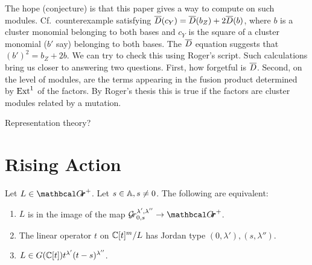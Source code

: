 \documentclass[draft]{article}
\begin{document}
The hope (conjecture) is that this paper gives a way to compute on such modules. Cf.\ counterexample satisfying $\barD(c_Y) = \barD(b_Z) + 2\barD(b)$, where $b$ is a cluster monomial belonging to both bases and $c_Y$ is the square of a cluster monomial ($b'$ say) belonging to both bases. The $\barD$ equation suggests that $(b')^2 = b_Z + 2b$. We can try to check this using Roger's script. Such calculations bring us closer to answering two questions. First, how forgetful is $\barD$. Second, on the level of modules, are the terms appearing in the fusion product determined by $\Ext^1$ of the factors. By Roger's thesis this is true if the factors are cluster modules related by a mutation. 


Representation theory? 

\section{Rising Action} %

\begin{lemma} \label{le:Grl1l2}
    Let $ L \in \Grth^+ $.  Let $ s \in \AA, s \ne 0 $.  The following are equivalent:
    \begin{enumerate}
        \item $ L $ is in the image of the map $ \Gr^{\lambda', \lambda''}_{0,s} \rightarrow \Grth^+$. %
        \item The linear operator $ t $ on $ \CC[t]^m/L$ has Jordan type $(0,\lambda'), (s,\lambda'')$.
        \item $ L \in G(\CC[t]) t^{\lambda'} (t-s)^{\lambda''}$.
    \end{enumerate}
\end{lemma}
\end{document}
